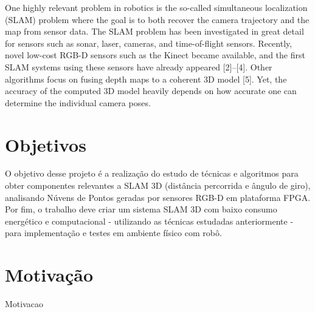 One highly relevant problem in robotics
is the so-called simultaneous localization (SLAM) problem
where the goal is to both recover the camera trajectory and
the map from sensor data. The SLAM problem has been
investigated in great detail for sensors such as sonar, laser,
cameras, and time-of-flight sensors. Recently, novel low-cost
RGB-D sensors such as the Kinect became available, and
the first SLAM systems using these sensors have already
appeared [2]–[4]. Other algorithms focus on fusing depth
maps to a coherent 3D model [5]. Yet, the accuracy of the
computed 3D model heavily depends on how accurate one
can determine the individual camera poses.
	
	
	\section*{Objetivos}\label{sec-objetivos}
	
	O objetivo desse projeto é a realização do estudo de técnicas e algoritmos para obter componentes relevantes a SLAM 3D (distância percorrida e ângulo de giro), analisando Núvens de Pontos geradas por sensores RGB-D em plataforma FPGA. Por fim, o trabalho deve criar um sistema SLAM 3D com baixo consumo energético e computacional - utilizando as técnicas estudadas anteriormente - para implementação e testes em ambiente físico com robô.

	\section*{Motivação}\label{sec-motivacao}
		
	Motivacao
	\cite{Rusu_ICRA2011_PCL}